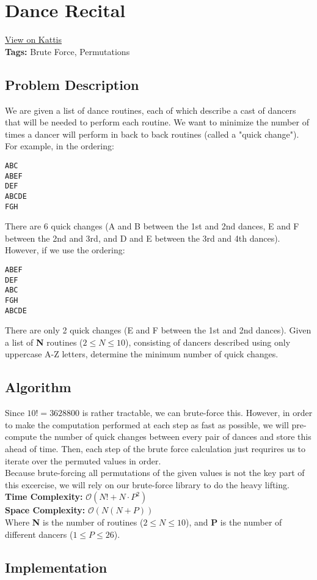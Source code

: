 \section{Dance Recital}
\label{dancerecital}
\href{https://open.kattis.com/problems/dancerecital}{View on Kattis}\\
\textbf{Tags:} Brute Force, Permutations\\
\subsection{Problem Description}

We are given a list of dance routines, each of which describe a cast of dancers
that will be needed to perform each routine. We want to minimize the number of
times a dancer will perform in back to back routines (called a "quick change").
For example, in the ordering:
\begin{verbatim}
ABC
ABEF
DEF
ABCDE
FGH
\end{verbatim}
There are 6 quick changes (A and B between the 1st and 2nd dances, E and F
between the 2nd and 3rd, and D and E between the 3rd and 4th dances). \\
\hfill\break
However, if we use the ordering:
\begin{verbatim}
ABEF
DEF
ABC
FGH
ABCDE
\end{verbatim}
There are only 2 quick changes (E and F between the 1st and 2nd dances). Given
a list of \textbf{N} routines ($2 \leq N \leq 10$), consisting of dancers
described using only uppercase A-Z letters, determine the minimum number of
quick changes.
\subsection{Algorithm}

Since $10! = 3628800$ is rather tractable, we can brute-force this. However,
in order to make the computation performed at each step as fast as possible,
we will pre-compute the number of quick changes between every pair of dances
and store this ahead of time. Then, each step of the brute force calculation
just requrires us to iterate over the permuted values in order.\\
\hfill\break
Because brute-forcing all permutations of the given values is not the key
part of this excercise, we will rely on our brute-force library to do the
heavy lifting. \\
\hfill\break
\textbf{Time Complexity:} $\mathcal{O}(N! + N \cdot P^2)$\\
\textbf{Space Complexity:} $\mathcal{O}(N(N+P))$\\
Where \textbf{N} is the number of routines ($2 \leq N \leq 10$), and \textbf{P}
 is the number of different dancers ($1 \leq P \leq 26$).
\subsection{Implementation}

\pagebreak
